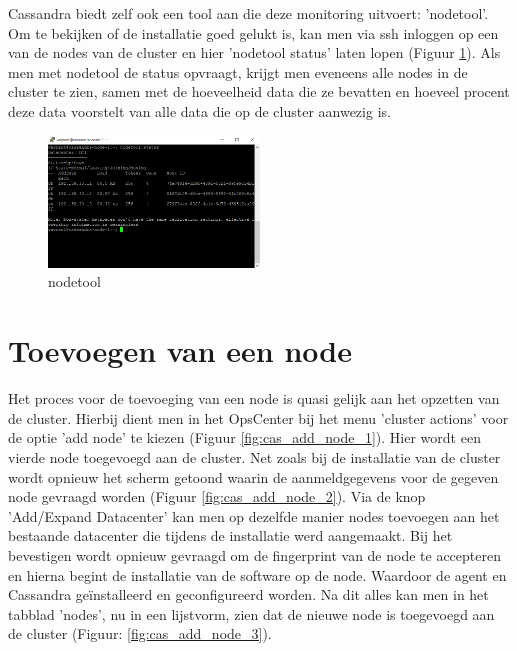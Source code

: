 Cassandra biedt zelf ook een tool aan die deze monitoring uitvoert: 'nodetool'.
Om te bekijken of de installatie goed gelukt is, kan men via ssh inloggen op een van de nodes van de cluster en hier 'nodetool status' laten lopen (Figuur \ref{fig:cas_nodetool}).
Als men met nodetool de status opvraagt, krijgt men eveneens alle nodes in de cluster te zien, samen met de hoeveelheid data die ze bevatten en hoeveel procent deze data voorstelt van alle data die op de cluster aanwezig is.

\begin{figure}[H]
	\centering
	\includegraphics[width=0.5\textwidth]{img/4_installatie_cassandra/3_Node_setup}
	\caption{nodetool}
	\label{fig:cas_nodetool}
\end{figure}

\section{Toevoegen van een node}
Het proces voor de toevoeging van een node is quasi gelijk aan het opzetten van de cluster.
Hierbij dient men in het OpsCenter bij het menu 'cluster actions' voor de optie 'add node' te kiezen (Figuur \ref{fig:cas_add_node_1}).
Hier wordt een vierde node toegevoegd aan de cluster.
Net zoals bij de installatie van de cluster wordt opnieuw het scherm getoond waarin de aanmeldgegevens voor de gegeven node gevraagd worden (Figuur \ref{fig:cas_add_node_2}).
Via de knop 'Add/Expand Datacenter' kan men op dezelfde manier nodes toevoegen aan het bestaande datacenter die tijdens de installatie werd aangemaakt.
Bij het bevestigen wordt opnieuw gevraagd om de fingerprint van de node te accepteren en hierna begint de installatie van de software op de node.
Waardoor de agent en Cassandra geïnstalleerd en geconfigureerd worden.
Na dit alles kan men in het tabblad 'nodes', nu in een lijstvorm, zien dat de nieuwe node is toegevoegd aan de cluster (Figuur: \ref{fig:cas_add_node_3}).

